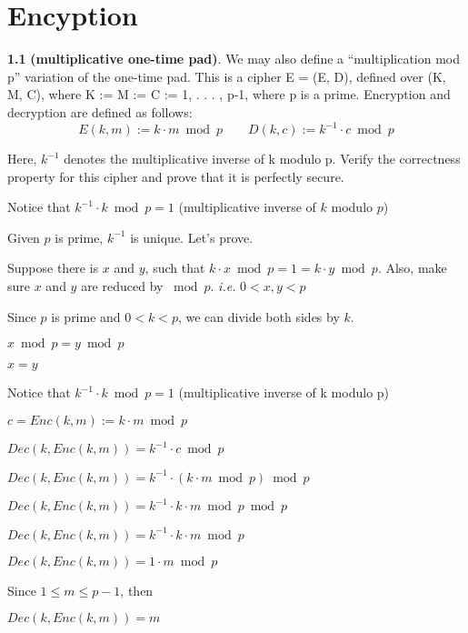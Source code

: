 \chapter{Encyption}

\noindent
\textbf{1.1} \hspace{1em}
\textbf{(multiplicative one-time pad)}. We may also define a “multiplication mod p” variation of the one-time pad.
This is a cipher E = (E, D), defined over (K, M, C), where K := M := C := {1, . . . , p-1}, where p is a prime.
Encryption and decryption are defined as follows:
\[
E(k, m) := k \cdot m \bmod p \quad\quad
D(k, c) := k^{-1} \cdot c \bmod p
\]

Here, $k^{-1}$ denotes the multiplicative inverse of k modulo p. Verify the correctness property for this
cipher and prove that it is perfectly secure.


\begin{tcolorbox}[solutionbox, title=Answer: Auxiliary]
    Notice that $k^{-1} \cdot k \bmod p = 1$ (multiplicative inverse of $k$ modulo $p$)
    \vspace{1em}

    Given $p$ is prime, $k^{-1}$ is unique. Let's prove.

    Suppose there is $x$ and $y$, such that $k \cdot x \bmod p = 1 = k \cdot y \bmod p$. Also, make sure $x$ and $y$ are reduced by $\bmod p$. \textit{i.e.} $0 < x, y < p$

    Since $p$ is prime and $0 < k < p$, we can divide both sides by $k$.

    $x \bmod p = y \bmod p$

    $x = y$

\end{tcolorbox}


\begin{tcolorbox}[solutionbox, title=Answer: Correctess]
    Notice that $k^{-1} \cdot k \bmod p = 1$ (multiplicative inverse of k modulo p)
    \vspace{1em}

    $c = Enc(k, m):= k \cdot m \bmod p$

    $Dec(k, Enc(k, m)) = k^{-1} \cdot c \bmod p$

    $Dec(k, Enc(k, m)) = k^{-1} \cdot (k \cdot m \bmod p) \bmod p$

    $Dec(k, Enc(k, m)) = k^{-1} \cdot k \cdot m \bmod p \bmod p$

    $Dec(k, Enc(k, m)) = k^{-1} \cdot k \cdot m \bmod p$

    $Dec(k, Enc(k, m)) = 1 \cdot m \bmod p$

    Since $1 \leqslant  m \leqslant p-1$, then

    $Dec(k, Enc(k, m)) = m$
\end{tcolorbox}

